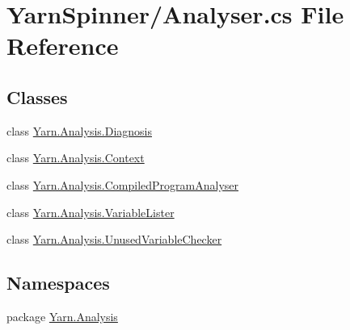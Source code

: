 \hypertarget{a00282}{\section{Yarn\-Spinner/\-Analyser.cs File Reference}
\label{a00282}
}
\subsection*{Classes}
\begin{DoxyCompactItemize}
\item 
class \hyperlink{a00089}{Yarn.\-Analysis.\-Diagnosis}
\item 
class \hyperlink{a00056}{Yarn.\-Analysis.\-Context}
\item 
class \hyperlink{a00052}{Yarn.\-Analysis.\-Compiled\-Program\-Analyser}
\item 
class \hyperlink{a00168}{Yarn.\-Analysis.\-Variable\-Lister}
\item 
class \hyperlink{a00165}{Yarn.\-Analysis.\-Unused\-Variable\-Checker}
\end{DoxyCompactItemize}
\subsection*{Namespaces}
\begin{DoxyCompactItemize}
\item 
package \hyperlink{a00345}{Yarn.\-Analysis}
\end{DoxyCompactItemize}
